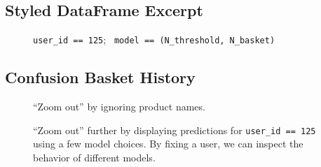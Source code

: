 \documentclass[handout]{beamer}
\begin{document}
\subsection{Styled DataFrame Excerpt}

\begin{frame}
\begin{figure}[]
\begin{center}
\caption[
]{
\texttt{user\_id == 125};
\texttt{
model ==  
(\textquotesingle{}N\_threshold\textquotesingle{},
\textquotesingle{}N\_basket\textquotesingle{})
}
}
\label{fig:styled-df}
\end{center}
\end{figure}
\end{frame}

\subsection{Confusion Basket History}

\begin{frame}
 \begin{figure}[]
\begin{center}
\end{center}
\caption{``Zoom out'' by ignoring product names.}
\label{fig:style}
\end{figure}

\end{frame}



\begin{frame}
 
\begin{figure}
\begin{center}
\caption[%
]
{``Zoom out'' further by displaying predictions for \texttt{user\_id == 125} using a few model choices. By fixing a user, we can inspect the behavior of different models.}
\label{fig:models-styles}
\end{center}
\end{figure}

\end{frame}
\end{document}
